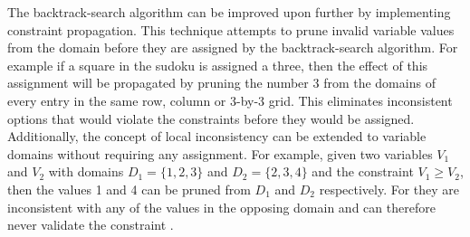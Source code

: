 The backtrack-search algorithm can be improved upon further by implementing constraint propagation. This technique attempts to prune invalid variable values from the domain before they are assigned by the backtrack-search algorithm. For example if a square in the sudoku is assigned a three, then the effect of this assignment will be propagated by pruning the number 3 from the domains of every entry in the same row, column or 3-by-3 grid. This eliminates inconsistent options that would violate the constraints before they would be assigned. Additionally, the concept of local inconsistency can be extended to variable domains without requiring any assignment. For example, given two variables $V_1$ and $V_2$ with domains $D_1=\{1,2,3\}$ and $D_2=\{2,3,4\}$ and the constraint $V_1 \geq V_2$, then the values 1 and 4 can be pruned from $D_1$ and $D_2$ respectively. For they are inconsistent with any of the values in the opposing domain and can therefore never validate the constraint \cite{constraint_general, constraint_algorithm}.





